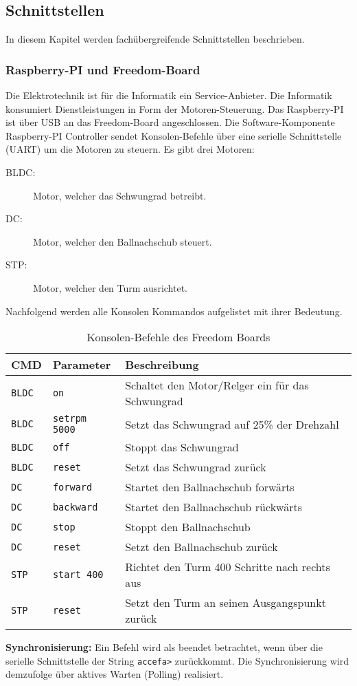 \subsection{Schnittstellen}
In diesem Kapitel werden fachübergreifende Schnittstellen beschrieben.

\subsubsection{Raspberry-PI und Freedom-Board}
\label{sec:schnittstelle-raspi-freedom}
Die Elektrotechnik ist für die Informatik ein Service-Anbieter. Die
Informatik konsumiert Dienstleistungen in Form der Motoren-Steuerung.
Das Raspberry-PI ist über USB an das Freedom-Board angeschlossen. Die
Software-Komponente Raspberry-PI Controller sendet Konsolen-Befehle
über eine serielle Schnittstelle (UART) um die Motoren zu steuern. Es
gibt drei Motoren:

\begin{description}
	\item[BLDC:] Motor, welcher das Schwungrad betreibt.
	\item[DC:] Motor, welcher den Ballnachschub steuert.
	\item[STP:] Motor, welcher den Turm ausrichtet.
\end{description}

\noindent
Nachfolgend werden alle Konsolen Kommandos aufgelistet mit ihrer
Bedeutung. \\

\begin{table}[h!]
	\centering
	\renewcommand{\arraystretch}{1.5}
	\begin{tabular}{l l l}
		\textbf{CMD}	& \textbf{Parameter}	& \textbf{Beschreibung} \\
		\hline
		\texttt{BLDC} 	& \texttt{on} 		& Schaltet den Motor/Relger ein für das Schwungrad	\\
		\texttt{BLDC} 	& \texttt{setrpm 5000}	& Setzt das Schwungrad auf 25\% der Drehzahl	\\ 
		\texttt{BLDC} 	& \texttt{off}		& Stoppt das Schwungrad		\\ 
		\texttt{BLDC} 	& \texttt{reset}	& Setzt das Schwungrad zurück		\\ 
		\texttt{DC}	& \texttt{forward}	& Startet den Ballnachschub forwärts	\\ 
		\texttt{DC}	& \texttt{backward}	& Startet den Ballnachschub rückwärts	\\ 
		\texttt{DC}	& \texttt{stop}		& Stoppt den Ballnachschub		\\ 
		\texttt{DC} 	& \texttt{reset}	& Setzt den Ballnachschub zurück	\\ 
		\texttt{STP} 	& \texttt{start 400}	& Richtet den Turm 400 Schritte nach rechts aus \\ 
		\texttt{STP}	& \texttt{reset}	& Setzt den Turm an seinen Ausgangspunkt zurück \\ 
	\end{tabular} 
	\caption{Konsolen-Befehle des Freedom Boards}
	\label{tab:freedom-board-konsolen-befehle}
\end{table}

\noindent
\textbf{Synchronisierung:} Ein Befehl wird als beendet betrachtet, wenn über die serielle Schnittstelle der String \texttt{accefa>} zurückkommt. Die Synchronisierung wird demzufolge über aktives Warten (Polling) realisiert.
